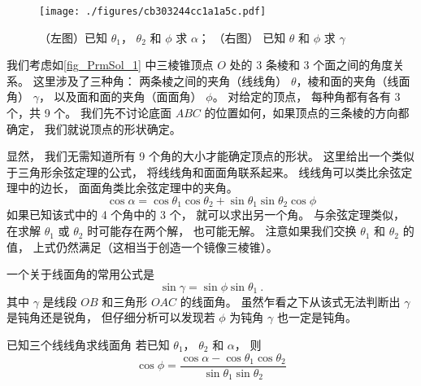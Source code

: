 


\begin{figure}[ht]
\centering
\texttt{[image: ./figures/cb303244cc1a1a5c.pdf]}
\caption{（左图）已知 $\theta_1$， $\theta_2$ 和 $\phi$ 求 $\alpha$； （右图） 已知 $\theta$ 和 $\phi$ 求 $\gamma$} \label{fig_PrmSol_1}
\end{figure}

我们考虑如\autoref{fig_PrmSol_1} 中三棱锥顶点 $O$ 处的 3 条棱和 3 个面之间的角度关系。 这里涉及了三种角： 两条棱之间的夹角（线线角） $\theta$，棱和面的夹角（线面角） $\gamma$， 以及面和面的夹角（面面角） $\phi$。 对给定的顶点， 每种角都有各有 3 个，共 9 个。 我们先不讨论底面 $ABC$ 的位置如何，如果顶点的三条棱的方向都确定， 我们就说顶点的形状确定。

显然， 我们无需知道所有 9 个角的大小才能确定顶点的形状。 这里给出一个类似于三角形余弦定理的公式， 将线线角和面面角联系起来。 线线角可以类比余弦定理中的边长， 面面角类比余弦定理中的夹角。
\begin{equation}\label{eq_PrmSol_1}
\cos\alpha = \cos\theta_1 \cos\theta_2 + \sin\theta_1 \sin\theta_2 \cos\phi
\end{equation}
如果已知该式中的 4 个角中的 3 个， 就可以求出另一个角。 与余弦定理类似， 在求解 $\theta_1$ 或 $\theta_2$ 时可能存在两个解， 也可能无解。 注意如果我们交换 $\theta_1$ 和 $\theta_2$ 的值， 上式仍然满足（这相当于创造一个镜像三棱锥）。

一个关于线面角的常用公式是
\begin{equation}\label{eq_PrmSol_2}
\sin\gamma = \sin\phi\sin\theta_1~.
\end{equation}
其中 $\gamma$ 是线段 $OB$ 和三角形 $OAC$ 的线面角。 虽然乍看之下从该式无法判断出 $\gamma$ 是钝角还是锐角， 但仔细分析可以发现若 $\phi$ 为钝角 $\gamma$ 也一定是钝角。

\begin{example}{已知三个线线角求线面角}
若已知 $\theta_1$， $\theta_2$ 和 $\alpha$， 则
\begin{equation}
\cos\phi = \frac{\cos\alpha - \cos\theta_1 \cos\theta_2}{\sin\theta_1 \sin\theta_2}
\end{equation}
\end{example}

